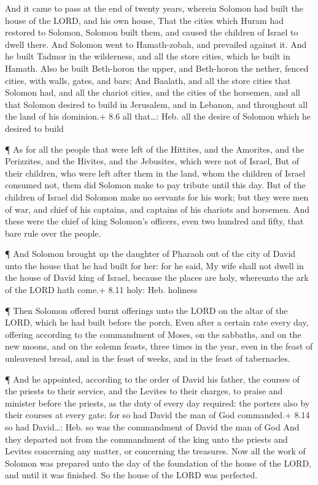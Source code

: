  And it came to pass at the end of twenty years, wherein
Solomon had built the house of the LORD, and his own house, 
That the cities which Huram had restored to Solomon, Solomon built them,
and caused the children of Israel to dwell there.  And
Solomon went to Hamath-zobah, and prevailed against it.  And
he built Tadmor in the wilderness, and all the store cities, which he
built in Hamath.  Also he built Beth-horon the upper, and
Beth-horon the nether, fenced cities, with walls, gates, and bars;
 And Baalath, and all the store cities that Solomon had, and
all the chariot cities, and the cities of the horsemen, and all that
Solomon desired to build in Jerusalem, and in Lebanon, and throughout
all the land of his dominion.+ 8.6 all that\ldots: Heb. all the desire
of Solomon which he desired to build

 ¶ As for all the people that were left of the Hittites, and
the Amorites, and the Perizzites, and the Hivites, and the Jebusites,
which were not of Israel,  But of their children, who were
left after them in the land, whom the children of Israel consumed not,
them did Solomon make to pay tribute until this day.  But of
the children of Israel did Solomon make no servants for his work; but
they were men of war, and chief of his captains, and captains of his
chariots and horsemen.  And these were the chief of king
Solomon's officers, even two hundred and fifty, that bare rule over the
people.

 ¶ And Solomon brought up the daughter of Pharaoh out of
the city of David unto the house that he had built for her: for he said,
My wife shall not dwell in the house of David king of Israel, because
the places are holy, whereunto the ark of the LORD hath come.+ 8.11
holy: Heb. holiness

 ¶ Then Solomon offered burnt offerings unto the LORD on
the altar of the LORD, which he had built before the porch,
 Even after a certain rate every day, offering according to
the commandment of Moses, on the sabbaths, and on the new moons, and on
the solemn feasts, three times in the year, even in the feast of
unleavened bread, and in the feast of weeks, and in the feast of
tabernacles.

 ¶ And he appointed, according to the order of David his
father, the courses of the priests to their service, and the Levites to
their charges, to praise and minister before the priests, as the duty of
every day required: the porters also by their courses at every gate: for
so had David the man of God commanded.+ 8.14 so had David\ldots: Heb. so
was the commandment of David the man of God  And they
departed not from the commandment of the king unto the priests and
Levites concerning any matter, or concerning the treasures.
 Now all the work of Solomon was prepared unto the day of
the foundation of the house of the LORD, and until it was finished. So
the house of the LORD was perfected.

